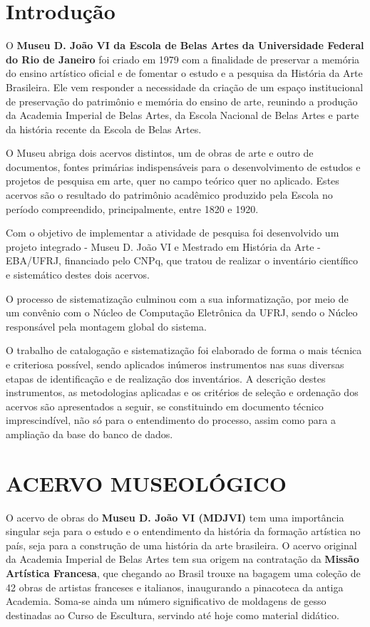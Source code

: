 
\section{Introdução}
O \textbf{Museu D. João VI da Escola de Belas Artes da Universidade Federal do Rio de Janeiro} foi criado em 1979 com a finalidade de preservar a memória do ensino artístico oficial e de fomentar o estudo e a pesquisa da História da Arte Brasileira. Ele vem responder a necessidade da criação de um espaço institucional de preservação do patrimônio e memória do ensino de arte, reunindo a produção da Academia Imperial de Belas Artes, da Escola Nacional de Belas Artes e parte da história recente da Escola de Belas Artes.

O Museu abriga dois acervos distintos, um de obras de arte e outro de documentos, fontes primárias indispensáveis para o desenvolvimento de estudos e projetos de pesquisa em arte, quer no campo teórico quer no aplicado. Estes acervos são o resultado do patrimônio acadêmico produzido pela Escola no período compreendido, principalmente, entre 1820 e 1920.

Com o objetivo de implementar a atividade de pesquisa foi desenvolvido um projeto integrado - Museu D. João VI e Mestrado em História da Arte - EBA/UFRJ, financiado pelo CNPq, que tratou de realizar o inventário científico e sistemático destes dois acervos. 

O processo de sistematização culminou com a sua informatização, por meio de um convênio com o Núcleo de Computação Eletrônica da UFRJ, sendo o Núcleo responsável pela montagem global do sistema.

O trabalho de catalogação e sistematização foi elaborado de forma o mais técnica e criteriosa possível, sendo aplicados inúmeros instrumentos nas suas diversas etapas de identificação e de realização dos inventários. A descrição destes instrumentos, as metodologias aplicadas e os critérios de seleção e ordenação dos acervos são apresentados a seguir, se constituindo em documento técnico imprescindível, não só para o entendimento do processo, assim como para a ampliação da base do banco de dados.

\section{ACERVO MUSEOLÓGICO}
O acervo de obras do \textbf{Museu D. João VI (MDJVI)} tem uma importância singular seja para o estudo e o entendimento da história da formação artística no país, seja para a construção de uma história da arte brasileira. O acervo original da Academia Imperial de Belas Artes tem sua origem na contratação da \textbf{Missão Artística Francesa}, que chegando ao Brasil trouxe na bagagem uma coleção de 42 obras de artistas franceses e italianos, inaugurando a pinacoteca da antiga Academia. Soma-se ainda um número significativo de moldagens de gesso destinadas ao Curso de Escultura, servindo até hoje como material didático. 

